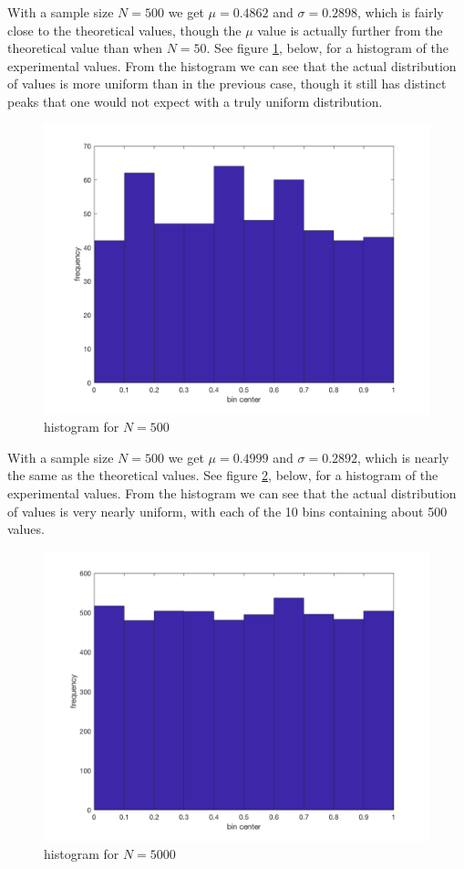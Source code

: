 \documentclass[11pt]{article}
\begin{document}
With a sample size $N=500$ we get $\mu=0.4862$ and $\sigma=0.2898$, which is fairly close to the theoretical values, though the $\mu$ value is actually further from the theoretical value than when $N=50$. See figure \ref{5_plot2}, below, for a histogram of the experimental values. From the histogram we can see that the actual distribution of values is more uniform than in the previous case, though it still has distinct peaks that one would not expect with a truly uniform distribution.

\begin{figure}[h!]
	\centering
	\includegraphics[width=0.6\linewidth]{5_plot2.png}
	\caption{histogram for $N=500$}
	\label{5_plot2}
\end{figure}

With a sample size $N=500$ we get $\mu=0.4999$ and $\sigma=0.2892$, which is nearly the same as the theoretical values. See figure \ref{5_plot3}, below, for a histogram of the experimental values. From the histogram we can see that the actual distribution of values is very nearly uniform, with each of the 10 bins containing about 500 values.

\begin{figure}[h!]
	\centering
	\includegraphics[width=0.6\linewidth]{5_plot3.png}
	\caption{histogram for $N=5000$}
	\label{5_plot3}
\end{figure}
\end{document}
